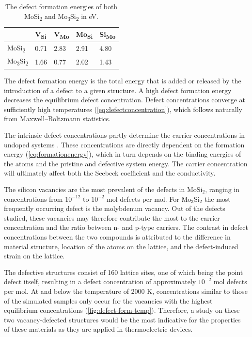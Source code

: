\documentclass[7.5pt]{article}
\theoremstyle{plain}
\theoremstyle{definition}
\newcommand{\<}{\langle}
\renewcommand{\>}{\rangle}
\begin{document}
\begin{table}[t!]
\caption{The defect formation energies of both MoSi\textsubscript{2} and Mo\textsubscript{3}Si\textsubscript{2} in eV.}
\centering
\begin{tabular}{@{}lllll@{}}
\toprule
      & V\textsubscript{Si}  & V\textsubscript{Mo}  & Mo\textsubscript{Si} & Si\textsubscript{Mo} \\ \midrule
MoSi\textsubscript{2} & 0.71 & 2.83 & 2.91  & 4.80  \\
Mo\textsubscript{3}Si\textsubscript{2} & 1.66 & 0.77 & 2.02  & 1.43 
\end{tabular}
\end{table}

\begin{multicols}{2}

\noindent The defect formation energy is the total energy that is added or released by the introduction of a defect to a given structure. 
A high defect formation energy decreases the equilibrium defect concentration. 
Defect concentrations converge at sufficiently high temperatures (\autoref{eq:defectconcentration}), which follows naturally from Maxwell–Boltzmann statistics.

The intrinsic defect concentrations partly determine the carrier concentrations in undoped systems \cite{carriertemp}. 
These concentrations are directly dependent on the formation energy (\autoref{eq:formationenergy}), which in turn depends on the binding energies of the atoms and the pristine and defective system energy.
The carrier concentration will ultimately affect both the Seebeck coefficient and the conductivity.


The silicon vacancies are the most prevalent of the defects in $\text{MoSi}_2$, ranging in concentrations from $10^{-12}$ to $10^{-2}$ mol defects per mol. 
For $\text{Mo}_3\text{Si}_2$ the most frequently occurring defect is the molybdenum vacancy. 
Out of the defects studied, these vacancies may therefore contribute the most to the carrier concentration and the ratio between n- and p-type carriers.
The contrast in defect concentrations between the two compounds is attributed to the difference in material structure, location of the atoms on the lattice, and the defect-induced strain on the lattice.

The defective structures consist of 160 lattice sites, one of which being the point defect itself, resulting in a defect concentration of approximately $10^{-2}$ mol defects per mol. 
At and below the temperature of 2000 K, concentrations similar to those of the simulated samples only occur for the vacancies with the highest equilibrium concentrations (\autoref{fig:defect-form-temp}). 
Therefore, a study on these two vacancy-defected structures would be the most indicative for the  properties of these materials as they are applied in thermoelectric devices.


\end{multicols}
\end{document}
